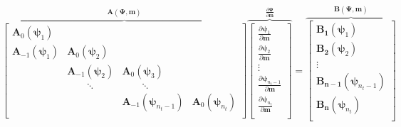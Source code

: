 \begin{equation}
\label{eq:richards-timestep-deriv-matrix}
\overbrace{
    \left[
    \begin{array}{cccc}
        \mathbf{A}_0(\boldsymbol{\psi}_1)\\
        \mathbf{A}_{-1}(\boldsymbol{\psi}_1)&\mathbf{A}_0(\boldsymbol{\psi}_2)\\
        &\mathbf{A}_{-1}(\boldsymbol{\psi}_2)&\mathbf{A}_0(\boldsymbol{\psi}_3)\\
        &\qquad\ddots&\qquad\ddots\\
        &&\mathbf{A}_{-1}(\boldsymbol{\psi}_{n_{t}-1})&\mathbf{A}_0(\boldsymbol{\psi}_{n_{t}})\\
    \end{array}
    \right]
}^{\mathbf{A}(\boldsymbol{\Psi},\mathbf{m})}
\overbrace{
    \left[
    \begin{array}{c}
        \frac{\partial \boldsymbol{\psi}_1}{\partial \mathbf{m}}\\
        \frac{\partial \boldsymbol{\psi}_2}{\partial \mathbf{m}}\\
        \vdots\\
        \frac{\partial \boldsymbol{\psi}_{n_{t}-1}}{\partial \mathbf{m}}\\
        \frac{\partial \boldsymbol{\psi}_{n_{t}}}{\partial \mathbf{m}}\\
    \end{array}
    \right]
}^{\frac{\partial\boldsymbol{\Psi}}{\partial\mathbf{m}}}
    =
\overbrace{
    \left[
    \begin{array}{c}
        \mathbf{B_1}(\boldsymbol{\psi}_1)\\
        \mathbf{B_2}(\boldsymbol{\psi}_2)\\
        \vdots\\
        \mathbf{B_{n-1}}(\boldsymbol{\psi}_{n_{t}-1})\\
        \mathbf{B_n}(\boldsymbol{\psi}_{n_{t}})\\
    \end{array}
    \right]
}^{\mathbf{B}(\boldsymbol{\Psi},\mathbf{m})}
\end{equation}
